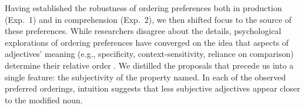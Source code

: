 \documentclass[12pt]{article}
\begin{document}
Having established the robustness of ordering preferences both in production (Exp.~1) and in comprehension (Exp.~2), we then shifted focus to the source of these preferences. While researchers disagree about the details, psychological explorations of ordering preferences have converged on the idea that aspects of  adjectives' meaning (e.g., specificity, context-sensitivity, reliance on comparison) determine their relative order \cite{sweet1898,ziff1960,martin1969determinants,martin1969competence,martin1970,kemmereretal2009}. %
We distilled the proposals that precede us into a single feature: the subjectivity of the property named. In each of the observed preferred orderings, intuition suggests that less subjective adjectives appear closer to the modified noun. 
\end{document}
